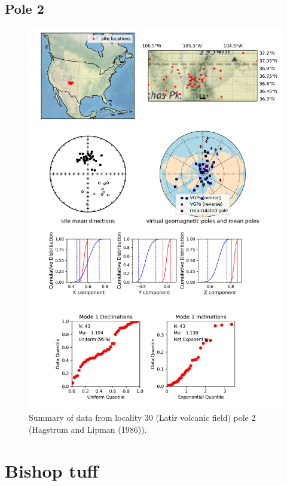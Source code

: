 \subsection{Pole 2}


\begin{figure}[H]
\centering
\includegraphics[width=5 in]{./30/2/pole_summary.png}
\caption{Summary of data from locality 30 (Latir volcanic field) pole 2 (Hagstrum and Lipman (1986)).}
\end{figure}

\section{Bishop tuff}
